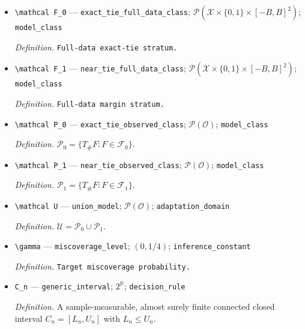 \documentclass{article}
\begin{document}
\begin{itemize}
  \item \texttt{\textbackslash{}\allowbreak{}mathcal F\_\allowbreak{}0} --- \texttt{exact\_\allowbreak{}tie\_\allowbreak{}full\_\allowbreak{}data\_\allowbreak{}class}; \(\mathcal P(\mathcal X\times\{0,1\}\times[-B,B]^2)\); \texttt{model\_\allowbreak{}class}
  \par\smallskip\noindent\emph{Definition.} \texttt{Full-\allowbreak{}data exact-\allowbreak{}tie stratum.}
  \item \texttt{\textbackslash{}\allowbreak{}mathcal F\_\allowbreak{}1} --- \texttt{near\_\allowbreak{}tie\_\allowbreak{}full\_\allowbreak{}data\_\allowbreak{}class}; \(\mathcal P(\mathcal X\times\{0,1\}\times[-B,B]^2)\); \texttt{model\_\allowbreak{}class}
  \par\smallskip\noindent\emph{Definition.} \texttt{Full-\allowbreak{}data margin stratum.}
  \item \texttt{\textbackslash{}\allowbreak{}mathcal P\_\allowbreak{}0} --- \texttt{exact\_\allowbreak{}tie\_\allowbreak{}observed\_\allowbreak{}class}; \(\mathcal P(\mathcal O)\); \texttt{model\_\allowbreak{}class}
  \par\smallskip\noindent\emph{Definition.} \(\mathcal P_0=\{T_\#F:F\in\mathcal F_0\}\).
  \item \texttt{\textbackslash{}\allowbreak{}mathcal P\_\allowbreak{}1} --- \texttt{near\_\allowbreak{}tie\_\allowbreak{}observed\_\allowbreak{}class}; \(\mathcal P(\mathcal O)\); \texttt{model\_\allowbreak{}class}
  \par\smallskip\noindent\emph{Definition.} \(\mathcal P_1=\{T_\#F:F\in\mathcal F_1\}\).
  \item \texttt{\textbackslash{}\allowbreak{}mathcal U} --- \texttt{union\_\allowbreak{}model}; \(\mathcal P(\mathcal O)\); \texttt{adaptation\_\allowbreak{}domain}
  \par\smallskip\noindent\emph{Definition.} \(\mathcal U=\mathcal P_0\cup\mathcal P_1\).
  \item \texttt{\textbackslash{}\allowbreak{}gamma} --- \texttt{miscoverage\_\allowbreak{}level}; \((0,1/4)\); \texttt{inference\_\allowbreak{}constant}
  \par\smallskip\noindent\emph{Definition.} \texttt{Target miscoverage probability.}
  \item \texttt{C\_\allowbreak{}n} --- \texttt{generic\_\allowbreak{}interval}; \(2^{\mathbb R}\); \texttt{decision\_\allowbreak{}rule}
  \par\smallskip\noindent\emph{Definition.} A sample-measurable, almost surely finite connected closed interval \(C_n=[L_n,U_n]\) with \(L_n\le U_n\).

\end{itemize}
\end{document}
